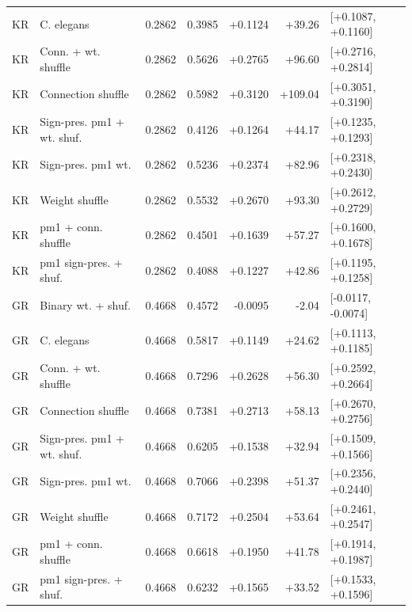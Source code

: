 \begin{tabular}{llrrrrl}
KR & C. elegans & 0.2862 & 0.3985 & +0.1124 & +39.26 & [+0.1087, +0.1160] \\
KR & Conn. + wt. shuffle & 0.2862 & 0.5626 & +0.2765 & +96.60 & [+0.2716, +0.2814] \\
KR & Connection shuffle & 0.2862 & 0.5982 & +0.3120 & +109.04 & [+0.3051, +0.3190] \\
KR & Sign-pres. pm1 + wt. shuf. & 0.2862 & 0.4126 & +0.1264 & +44.17 & [+0.1235, +0.1293] \\
KR & Sign-pres. pm1 wt. & 0.2862 & 0.5236 & +0.2374 & +82.96 & [+0.2318, +0.2430] \\
KR & Weight shuffle & 0.2862 & 0.5532 & +0.2670 & +93.30 & [+0.2612, +0.2729] \\
KR & pm1 + conn. shuffle & 0.2862 & 0.4501 & +0.1639 & +57.27 & [+0.1600, +0.1678] \\
KR & pm1 sign-pres. + shuf. & 0.2862 & 0.4088 & +0.1227 & +42.86 & [+0.1195, +0.1258] \\
GR & Binary wt. + shuf. & 0.4668 & 0.4572 & -0.0095 & -2.04 & [-0.0117, -0.0074] \\
GR & C. elegans & 0.4668 & 0.5817 & +0.1149 & +24.62 & [+0.1113, +0.1185] \\
GR & Conn. + wt. shuffle & 0.4668 & 0.7296 & +0.2628 & +56.30 & [+0.2592, +0.2664] \\
GR & Connection shuffle & 0.4668 & 0.7381 & +0.2713 & +58.13 & [+0.2670, +0.2756] \\
GR & Sign-pres. pm1 + wt. shuf. & 0.4668 & 0.6205 & +0.1538 & +32.94 & [+0.1509, +0.1566] \\
GR & Sign-pres. pm1 wt. & 0.4668 & 0.7066 & +0.2398 & +51.37 & [+0.2356, +0.2440] \\
GR & Weight shuffle & 0.4668 & 0.7172 & +0.2504 & +53.64 & [+0.2461, +0.2547] \\
GR & pm1 + conn. shuffle & 0.4668 & 0.6618 & +0.1950 & +41.78 & [+0.1914, +0.1987] \\
GR & pm1 sign-pres. + shuf. & 0.4668 & 0.6232 & +0.1565 & +33.52 & [+0.1533, +0.1596] \\
\bottomrule
\end{tabular}

